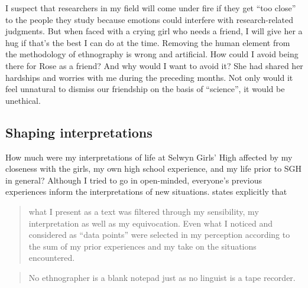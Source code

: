 I suspect that researchers in my field will come under fire if they get ``too close'' to the people they study because emotions could interfere with research-related judgments. But when faced with a crying girl who needs a friend, I will give her a hug if that's the best I can do at the time. Removing the human element from the methodology of ethnography is wrong and artificial.   How could I avoid being there for Rose as a friend?  And why would I want to avoid it?  She had shared her hardships and worries with me during the preceding months. Not only would it feel unnatural to dismiss our friendship on the basis of ``science'', it would be unethical.


\subsection{Shaping interpretations}

How much were my interpretations of life at Selwyn Girls' High affected by my closeness with the girls, my own high school experience, and my life prior to SGH in general?  Although I tried to go in open-minded, everyone's previous experiences inform the interpretations of new situations. \citet{mendozadenton2008} states explicitly that

\begin{quote}
	what I present as a text was filtered through my sensibility, my interpretation as well as my equivocation. Even what I noticed and considered as ``data points'' were selected in my perception according to the sum of my prior experiences and my take on the situations encountered. \citep[44]{mendozadenton2008}
\end{quote}

\begin{quote}
	No ethnographer is a blank note\-pad just as no linguist is a tape re\-corder. \citep[48]{mendozadenton2008}
\end{quote}
 
